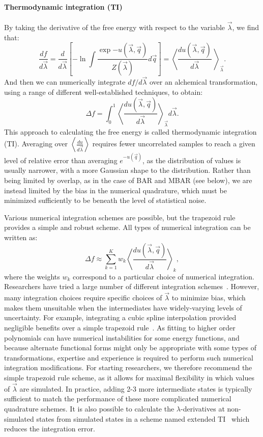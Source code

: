 \documentclass[9pt,bestpractices,pubversion]{livecoms}
\newcommand{\expect}[1]{\left\langle{#1}\right\rangle}
\begin{document}
\paragraph{Thermodynamic integration (TI)}
By taking the derivative of the free energy with respect to the
variable $\vec{\lambda}$, we find that:
\begin{equation}
\frac{df}{d\vec{\lambda}} = \frac{d}{d\vec{\lambda}} \left[-\ln \int \frac{\exp{-u(\vec{\lambda},\vec{q})}}{Z(\vec{\lambda})} d\vec{q}\right] = \expect{\frac{du(\vec{\lambda},\vec{q})}{d\vec{\lambda}}\
}_{\vec{\lambda}} .
\end{equation}
And then we can numerically integrate $df/d\vec{\lambda}$ over an alchemical transformation, using a range of different well-established techniques, to obtain:
\begin{equation}
\Delta f    = \int_{0}^{1} \expect{\frac{du(\vec{\lambda},\vec{q})}{d\vec{\lambda}}}_{\vec{\lambda}}  d\vec{\lambda}.    
\end{equation}
This approach to calculating the free energy is called thermodynamic integration (TI). Averaging over $\expect{\frac{du}{d\vec{\lambda}}}$ requires fewer uncorrelated samples to reach a given level of relative error
than averaging $e^{-u(\vec{q})}$, as the distribution of values is usually narrower, with a more Gaussian shape to the distribution. Rather than being limited by overlap, as in the case of BAR and MBAR (see below), we are instead limited by the bias in the numerical quadrature, which must be minimized sufficiently to be beneath the level of statistical noise.

Various numerical integration schemes are possible, but the trapezoid
rule provides a simple and robust scheme. All types of numerical integration can be written as:
\[ \Delta f \approx \sum_{k=1}^{K} w_k
\expect{\frac{du(\vec{\lambda},\vec{q})}{d\vec{\lambda}}}_{k}, \] where the weights $w_k$ correspond to a particular choice of numerical integration.
Researchers have tried a large number of different integration schemes~\cite{resat1993studies,jorge2010effect,shyu2009reducing}. However, many integration choices require specific choices of $\vec{\lambda}$ to minimize bias, which makes them unsuitable when the intermediates
have widely-varying levels of uncertainty. For example, integrating a cubic spline interpolation provided negligible benefits over a simple trapezoid rule~\cite{paliwal2011benchmark}. As fitting to higher order polynomials can have numerical instabilities for some energy functions, and because alternate functional forms might only be appropriate with some types of transformations, expertise and experience is required to perform such numerical integration modifications. For starting researchers, we therefore recommend the simple trapezoid rule scheme, as it allows for maximal flexibility in which values of $\vec{\lambda}$ are simulated. In practice, adding 2-3 more intermediate states is typically sufficient to match the performance of these more complicated numerical quadrature schemes. It is also possible to calculate the $\lambda$-derivatives at non-simulated states from simulated states in a scheme named extended TI~\cite{ruiter2016extended} which reduces the integration error.
\end{document}
